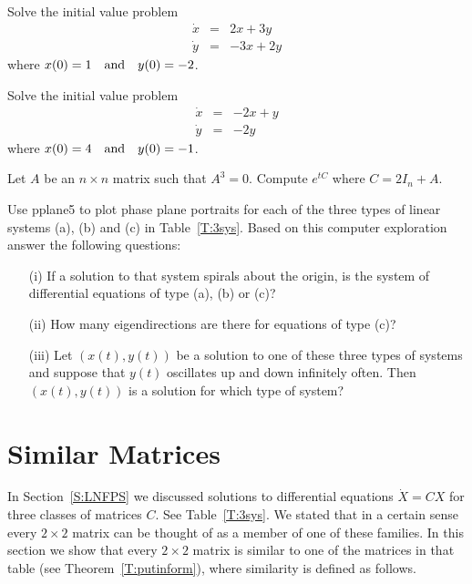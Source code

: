 \documentclass{ximera}
\begin{document}
\EXER

\TEXER

\begin{exercise} \label{c6.3.1}
Solve the initial value problem
\[
\begin{array}{rcr}
\dot{x} & = & 2x + 3y \\
\dot{y} & = & -3x + 2y
\end{array}
\]
where $x(0) = 1  \quad\mbox{and}\quad  y(0) = -2$.
\end{exercise}

\begin{exercise} \label{c6.3.2}
Solve the initial value problem
\[
\begin{array}{rcr}
\dot{x} & = & -2x + y \\
\dot{y} & = & -2y
\end{array}
\]
where $x(0) = 4  \quad\mbox{and}\quad y(0) = -1$.
\end{exercise}

\begin{exercise} \label{c6.3.25}
Let $A$ be an $n\times n$ matrix such that $A^3=0$.  Compute $e^{tC}$
where $C=2I_n+A$.
\end{exercise}

\CEXER

\begin{exercise} \label{c6.3.3}
Use {\sf pplane5} to plot phase plane portraits for each of the
three types of linear systems (a), (b) and (c) in Table~\ref{T:3sys}.
Based on this computer exploration answer the following questions:
\begin{itemize}
\item[(i)]  If a solution to that system spirals about the origin,
is the system of differential equations of type (a), (b) or (c)?
\item[(ii)]  How many eigendirections are there for equations of type (c)?
\item[(iii)]  Let $(x(t),y(t))$ be a solution to one of these three types of
systems and suppose that $y(t)$ oscillates up and down infinitely often.
Then $(x(t),y(t))$ is a solution for which type of system?
\end{itemize}
\end{exercise}



\section{Similar Matrices} \label{S:6.5}

In Section~\ref{S:LNFPS} we discussed solutions to differential equations
$\dot{X}=CX$ for three classes of matrices $C$.  See Table~\ref{T:3sys}.
We stated that in a certain sense every $2\times 2$ matrix can be
thought of as a member of one of these families.  In this section we
show that every $2\times 2$ matrix is similar to one of the matrices in that
table (see Theorem~\ref{T:putinform}), where similarity is defined as follows.
\end{document}
